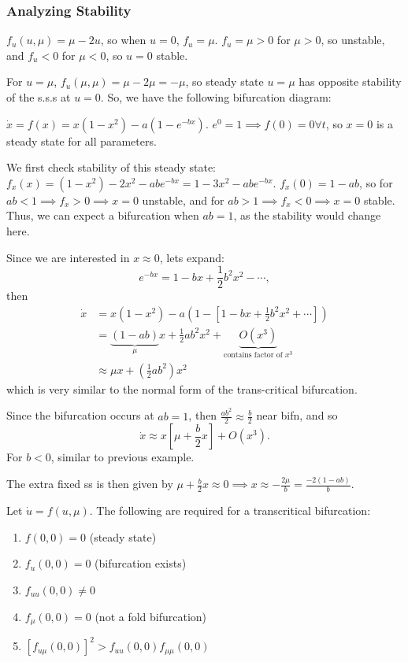 \documentclass[12pt, oneside]{article}
\begin{document}
\subsubsection{Analyzing Stability}
$f_u(u,\mu) = \mu - 2u$, so when $u = 0$, $f_u = \mu$. $f_u = \mu > 0$ for $\mu > 0$, so unstable, and $f_u < 0$ for $\mu < 0$, so $u = 0$ stable.

For $u = \mu$, $f_u(\mu,\mu) = \mu - 2 \mu = -\mu$, so steady state $u = \mu$ has opposite stability of the s.s.s at $u=0$. So, we have the following bifurcation diagram:


\begin{example}
  $\dot{x} = f(x) = x(1-x^2) - a(1-e^{-bx})$. $e^0 = 1 \implies f(0) = 0 \forall t$, so $x=0$ is a steady state for all parameters.

  We first check stability of this steady state:
  $f_x(x) = (1-x^2)-2x^2-abe^{-bx} = 1-3x^2 - abe^{-bx}$. $f_x(0) = 1 - ab$, so for $ab < 1 \implies f_x > 0 \implies x = 0$ unstable, and for $ab > 1 \implies f_x < 0 \implies x= 0$ stable. Thus, we can expect a bifurcation when $ab=1$, as the stability would change here.

  Since we are interested in $x\approx 0$, lets expand:
  $$e^{-bx} = 1 - bx + \frac{1}{2}b^2x^2 - \cdots,$$then 
  \begin{align*}
  \dot{x} &= x(1-x^2)-a(1-[1-bx+\frac{1}{2}b^2x^2+\cdots])\\
  &= \underbrace{(1-ab)}_{\mu}x+\frac{1}{2}ab^2x^2 +\underbrace{O(x^3)}_{\text{contains factor of } x^3}\\
  &\approx \mu x + (\frac{1}{2}ab^2)x^2
  \end{align*}
  which is very similar to the normal form of the trans-critical bifurcation.

  Since the bifurcation occurs at $ab = 1$, then $\frac{ab^2}{2}\approx \frac{b}{2}$ near bifn, and so \[\dot{x} \approx x [\mu + \frac{b}{2}x] + O(x^3).\] For $b < 0$, similar to previous example.

  The extra fixed ss is then given by $\mu + \frac{b}{2}x \approx 0 \implies x \approx -\frac{2\mu}{b} = \frac{-2(1-ab)}{b}$.
\end{example}

\begin{definition}
  Let $\dot{u} = f(u,\mu)$. The following are required for a transcritical bifurcation:
  \begin{enumerate}[label=\roman*)]
    \item $f(0,0) = 0$ (steady state)
    \item $f_u(0,0) = 0$ (bifurcation exists)
    \item $f_{uu}(0,0) \neq 0$
    \item $f_\mu(0,0) = 0$ (not a fold bifurcation)
    \item $[f_{u\mu}(0,0)]^2 > f_{uu}(0,0)f_{\mu \mu}(0,0)$
  \end{enumerate}
\end{definition}
\end{document}
